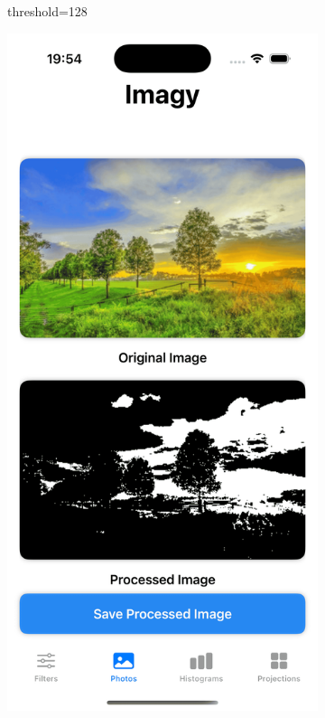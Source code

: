 \documentclass[a4paper]{article}
\begin{document}
\begin{figure}[H]
\begin{subfigure}{0.2\textwidth}
        \caption{threshold=128}
        \label{fig:trees_binary_128}
    \end{subfigure}
    \hfill
    \begin{subfigure}{0.2\textwidth}
        \centering
        \includegraphics[width=\linewidth]{images/trees_binary_183.png}

\end{subfigure}
\end{figure}
\end{document}
